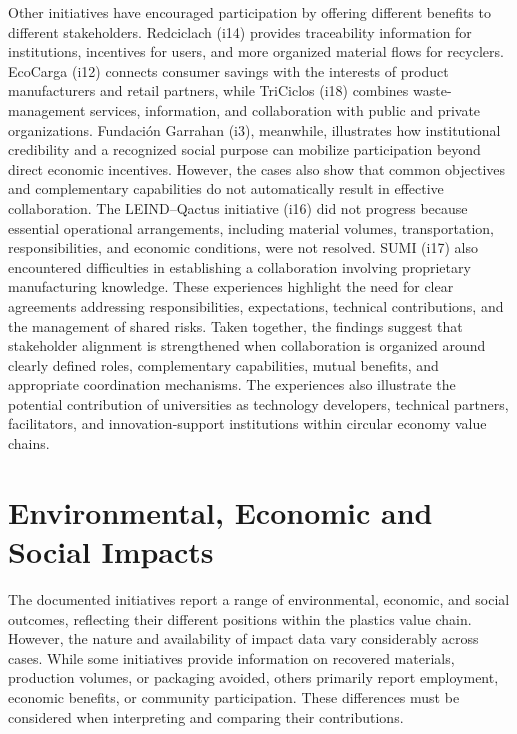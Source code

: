\documentclass[
  12pt,
  oneside]{book}
\begin{document}
Other initiatives have encouraged participation by offering different
benefits to different stakeholders. Redciclach (i14) provides
traceability information for institutions, incentives for users, and
more organized material flows for recyclers. EcoCarga (i12) connects
consumer savings with the interests of product manufacturers and retail
partners, while TriCiclos (i18) combines waste-management services,
information, and collaboration with public and private organizations.
Fundación Garrahan (i3), meanwhile, illustrates how institutional
credibility and a recognized social purpose can mobilize participation
beyond direct economic incentives. However, the cases also show that
common objectives and complementary capabilities do not automatically
result in effective collaboration. The LEIND--Qactus initiative (i16)
did not progress because essential operational arrangements, including
material volumes, transportation, responsibilities, and economic
conditions, were not resolved. SUMI (i17) also encountered difficulties
in establishing a collaboration involving proprietary manufacturing
knowledge. These experiences highlight the need for clear agreements
addressing responsibilities, expectations, technical contributions, and
the management of shared risks. Taken together, the findings suggest
that stakeholder alignment is strengthened when collaboration is
organized around clearly defined roles, complementary capabilities,
mutual benefits, and appropriate coordination mechanisms. The
experiences also illustrate the potential contribution of universities
as technology developers, technical partners, facilitators, and
innovation-support institutions within circular economy value chains.

\section{Environmental, Economic and Social
Impacts}\label{environmental-economic-and-social-impacts}

The documented initiatives report a range of environmental, economic,
and social outcomes, reflecting their different positions within the
plastics value chain. However, the nature and availability of impact
data vary considerably across cases. While some initiatives provide
information on recovered materials, production volumes, or packaging
avoided, others primarily report employment, economic benefits, or
community participation. These differences must be considered when
interpreting and comparing their contributions.
\end{document}
